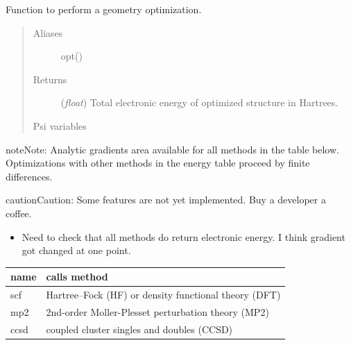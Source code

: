 \documentclass[letterpaper,10pt,english]{sphinxmanual}
\begin{document}
\begin{fulllineitems}
\label{index:driver.optimize}
Function to perform a geometry optimization.
\begin{quote}\begin{description}
\item[{Aliases }] \leavevmode
opt()

\item[{Returns}] \leavevmode
(\emph{float}) Total electronic energy of optimized structure in Hartrees.

\item[{Psi variables}] \leavevmode
\end{description}\end{quote}

\begin{fulllineitems}
\label{index:envvar-CURRENTENERGY}
\end{fulllineitems}


\begin{notice}{note}{Note:}
Analytic gradients area available for all methods in the table
below. Optimizations with other methods in the energy table proceed
by finite differences.
\end{notice}

\begin{notice}{caution}{Caution:}
Some features are not yet implemented. Buy a developer a coffee.
\begin{itemize}
\item {} 
Need to check that all methods do return electronic energy. I think gradient got changed at one point.

\end{itemize}
\end{notice}

\begin{tabulary}{\linewidth}{|L|L|}
\hline
\textbf{
name
} & \textbf{
calls method
}\\\hline

scf
 & 
Hartree--Fock (HF) or density functional theory (DFT)
\\\hline

mp2
 & 
2nd-order Moller-Plesset perturbation theory (MP2)
\\\hline

ccsd
 & 
coupled cluster singles and doubles (CCSD)
\\\hline


\end{tabulary}
\end{fulllineitems}
\end{document}
